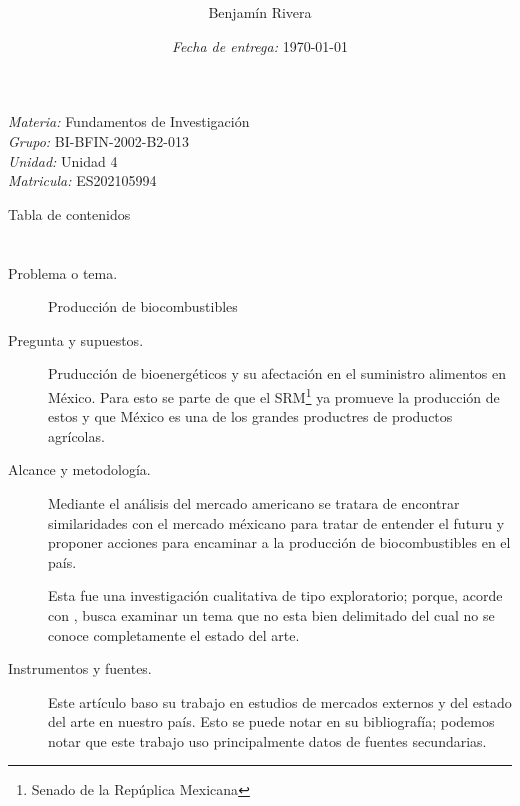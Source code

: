 \documentclass[10pt]{beamer}
\title[Actividad 1]{
	\bf{\titulo}}
\author{ Benjamín Rivera }
\institute{Universidad Abierta y a Distancia de México \\
	\tiny
	TSU en Biotecnolog\'ia }
\date{\textit{Fecha de entrega:} \today}
\newcommand{\materia}[0]{Fundamentos de Investigación}
\newcommand{\grupo}[0]{BI-BFIN-2002-B2-013}
\newcommand{\unidad}[0]{Unidad 4}
\begin{document}
	\begin{frame}
		\maketitle\tiny
		\textit{Materia:} \materia \\
		\textit{Grupo:} \grupo \\
		\textit{Unidad:} \unidad \\
		\textit{Matricula:} ES202105994
		
	\end{frame}

	\begin{frame}{Tabla de contenidos}
		\tableofcontents
	\end{frame}

\section{\cite{inv 1}}
	\begin{frame}{\cite{inv 1}}
		\begin{description}
			\item[Problema o tema.] Producción de biocombustibles
			\item[Pregunta y supuestos.] Pruducción de bioenergéticos y su afectación en el suministro alimentos en México. Para esto se parte de que el SRM\footnote{Senado de la Repúplica Mexicana} ya promueve la producción de estos y que México es una de los grandes productres de productos agrícolas.
		\end{description}
	\end{frame}
	\begin{frame}{\cite{inv 1}}
		\begin{description}
			\item[Alcance y metodología.] Mediante el análisis del mercado americano se tratara de encontrar similaridades con el mercado méxicano para tratar de entender el futuru y proponer acciones para encaminar a la producción de biocombustibles en el país. 
			\par Esta fue una investigación cualitativa de tipo exploratorio; porque, acorde con \cite{basica}, busca examinar un tema que no esta bien delimitado del cual no se conoce completamente el estado del arte.
			
			
			\item[Instrumentos y fuentes.] Este artículo baso su trabajo en estudios de mercados externos y del estado del arte en nuestro país. Esto se puede notar en su bibliografía; podemos notar que este trabajo uso principalmente datos de fuentes secundarias.
		\end{description}
	\end{frame}
\end{document}
